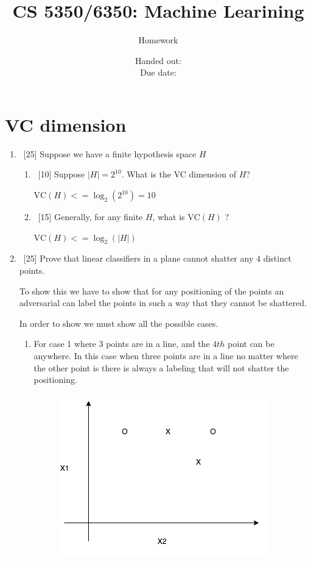 \documentclass[12pt, fullpage,letterpaper]{article}
\title{CS 5350/6350: Machine Learining \semester}
\author{Homework \assignmentId}
\date{Handed out: \releaseDate\\
  Due date: \dueDate}
\begin{document}
\maketitle





\section{VC dimension}
\begin{enumerate}
\item~[25] Suppose we have a finite hypothesis space $H$%
\begin{enumerate}
\item~[10] Suppose $|H| = 2^{10}$. What is the VC dimension of $H$?

    $\mathrm{VC}(H) <= \log_2(2^{10}) = 10$\\

\item~[15] Generally, for  any finite $H$, what is $\mathrm{VC}(H)$ ?

    $\mathrm{VC}(H) <= \log_2(|H|)$

\end{enumerate}
\item~[25] Prove that linear classifiers in a plane cannot shatter any $4$ distinct points.

    To show this we have to show that for any positioning of the points an adversarial can label the points in
    such a way that they cannot be shattered.

    In order to show we must show all the possible cases.

    \pagebreak
    \begin{enumerate}

    \item For case 1 where 3 points are in a line, and the $4th$ point can be anywhere. In this case when three points are in
    a line no matter where the other point is there is always a labeling that will not shatter the positioning.

    \begin{figure}[h]
        \centering
        \includegraphics[scale=.5]{all_in_line.png}
    \end{figure}



\end{enumerate}
\end{enumerate}
\end{document}
